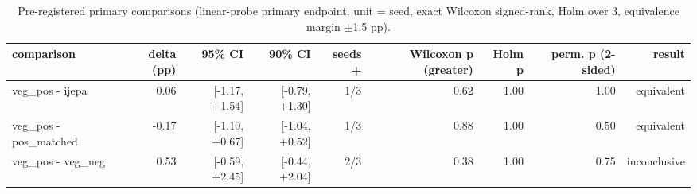 \begin{table}[t]
\centering
\small
\caption{Pre-registered primary comparisons (linear-probe primary endpoint, unit = seed, exact Wilcoxon signed-rank, Holm over 3, equivalence margin $\pm$1.5 pp).}
\label{tab:primary_comparisons}
\begin{tabular}{lrrrrrrrr}
\toprule
comparison & delta (pp) & 95\% CI & 90\% CI & seeds + & Wilcoxon p (greater) & Holm p & perm. p (2-sided) & result \\
\midrule
veg\_pos - ijepa & 0.06 & [-1.17, +1.54] & [-0.79, +1.30] & 1/3 & 0.62 & 1.00 & 1.00 & equivalent \\
veg\_pos - pos\_matched & -0.17 & [-1.10, +0.67] & [-1.04, +0.52] & 1/3 & 0.88 & 1.00 & 0.50 & equivalent \\
veg\_pos - veg\_neg & 0.53 & [-0.59, +2.45] & [-0.44, +2.04] & 2/3 & 0.38 & 1.00 & 0.75 & inconclusive \\
\bottomrule
\end{tabular}
\end{table}
